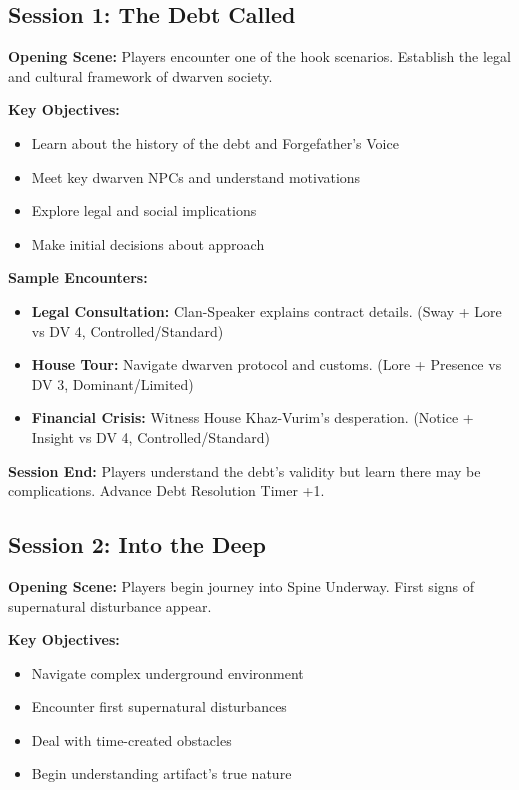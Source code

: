 \documentclass[11pt]{article}
\begin{document}
\subsection{Session 1: The Debt Called}

\textbf{Opening Scene:} Players encounter one of the hook scenarios. Establish the legal and cultural framework of dwarven society.

\textbf{Key Objectives:}
\begin{itemize}
\item Learn about the history of the debt and Forgefather's Voice
\item Meet key dwarven NPCs and understand motivations
\item Explore legal and social implications
\item Make initial decisions about approach
\end{itemize}

\textbf{Sample Encounters:}
\begin{itemize}
\item \textbf{Legal Consultation:} Clan-Speaker explains contract details. (Sway + Lore vs DV 4, Controlled/Standard)
\item \textbf{House Tour:} Navigate dwarven protocol and customs. (Lore + Presence vs DV 3, Dominant/Limited)
\item \textbf{Financial Crisis:} Witness House Khaz-Vurim's desperation. (Notice + Insight vs DV 4, Controlled/Standard)
\end{itemize}

\textbf{Session End:} Players understand the debt's validity but learn there may be complications. Advance Debt Resolution Timer +1.

\subsection{Session 2: Into the Deep}

\textbf{Opening Scene:} Players begin journey into Spine Underway. First signs of supernatural disturbance appear.

\textbf{Key Objectives:}
\begin{itemize}
\item Navigate complex underground environment
\item Encounter first supernatural disturbances
\item Deal with time-created obstacles
\item Begin understanding artifact's true nature
\end{itemize}
\end{document}
